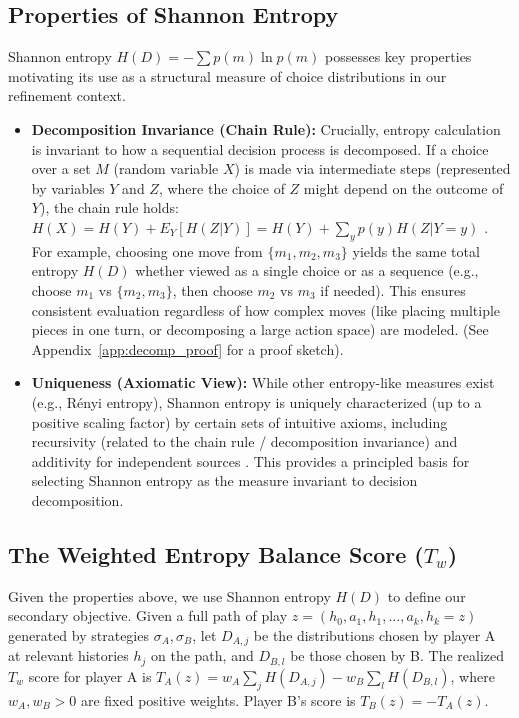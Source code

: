 \documentclass{article}
\begin{document}
\subsection{Properties of Shannon Entropy} \label{sec:entropy_properties}
Shannon entropy $H(D) = - \sum p(m) \ln p(m)$ possesses key properties motivating its use as a structural measure of choice distributions in our refinement context.
\begin{itemize}
    \item \textbf{Decomposition Invariance (Chain Rule):} Crucially, entropy calculation is invariant to how a sequential decision process is decomposed. If a choice over a set $M$ (random variable $X$) is made via intermediate steps (represented by variables $Y$ and $Z$, where the choice of $Z$ might depend on the outcome of $Y$), the chain rule holds: $H(X) = H(Y) + E_Y[H(Z|Y)] = H(Y) + \sum_y p(y) H(Z|Y=y)$ \cite{placeholder_cover_thomas}. For example, choosing one move from $\{m_1, m_2, m_3\}$ yields the same total entropy $H(D)$ whether viewed as a single choice or as a sequence (e.g., choose $m_1$ vs $\{m_2, m_3\}$, then choose $m_2$ vs $m_3$ if needed). This ensures consistent evaluation regardless of how complex moves (like placing multiple pieces in one turn, or decomposing a large action space) are modeled. (See Appendix~\ref{app:decomp_proof} for a proof sketch).
    \item \textbf{Uniqueness (Axiomatic View):} While other entropy-like measures exist (e.g., Rényi entropy), Shannon entropy is uniquely characterized (up to a positive scaling factor) by certain sets of intuitive axioms, including recursivity (related to the chain rule / decomposition invariance) and additivity for independent sources \cite{placeholder_shannon_axioms, placeholder_cover_thomas}. This provides a principled basis for selecting Shannon entropy as the measure invariant to decision decomposition.
\end{itemize}

\subsection{The Weighted Entropy Balance Score (\texorpdfstring{$T_w$}{Tw})}
Given the properties above, we use Shannon entropy $H(D)$ to define our secondary objective. Given a full path of play $z = (h_0, a_1, h_1, \dots, a_k, h_k=z)$ generated by strategies $\sigma_A, \sigma_B$, let $D_{A,j}$ be the distributions chosen by player A at relevant histories $h_j$ on the path, and $D_{B,l}$ be those chosen by B. The realized $T_w$ score for player A is $T_A(z) = w_A \sum_j H(D_{A,j}) - w_B \sum_l H(D_{B,l})$, where $w_A, w_B > 0$ are fixed positive weights. Player B's score is $T_B(z) = -T_A(z)$.
\end{document}
